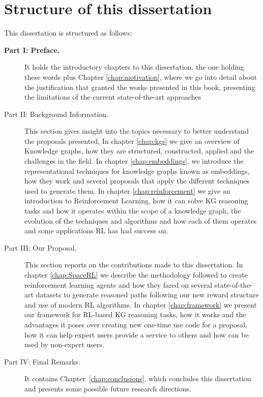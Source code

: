 \section{Structure of this dissertation}\label{sec:intro-structure}
This dissertation is structured as follows:

\begin{description}
    \item[\textbf{Part I: Preface.}] 
    It holds the introductory chapters to this dissertation, the one holding these words plus Chapter \ref{chap:motivation}, where we go into detail about the justification that granted the works presented in this book, presenting the limitations of the current state-of-the-art approaches\\
    
    \item[Part II: Background Information.] 
    This section gives insight into the topics necessary to better understand the proposals presented, In chapter \ref{chap:kgs} we give an overview of Knowledge graphs, how they are structured, constructed, applied and the challenges in the field. In chapter \ref{chap:embeddings}, we introduce the representational techniques for knowledge graphs known as embeddings, how they work and several proposals that apply the different techniques used to generate them. In chapter \ref{chap:reinforcement} we give an introduction to Reinforcement Learning, how it can solve KG reasoning tasks and how it operates within the scope of a knowledge graph, the evolution of the techniques and algorithms and how each of them operates and some applications RL has had success on.
    
    \item[Part III: Our Proposal.]
    This section reports on the contributions made to this dissertation. In chapter \ref{chap:SpaceRL} we describe the methodology followed to create reinforcement learning agents and how they fared on several state-of-the-art datasets to generate reasoned paths following our new reward structure and use of modern RL algorithms. In chapter \ref{chap:framework} we present our framework for RL-based KG reasoning tasks, how it works and the advantages it poses over creating new one-time use code for a proposal, how it can help expert users provide a service to others and how can be used by non-expert users.
    
    \item[Part IV: Final Remarks.]
    It contains Chapter~\ref{chap:conclusions}, which concludes this dissertation and presents some possible future research directions.
\end{description}